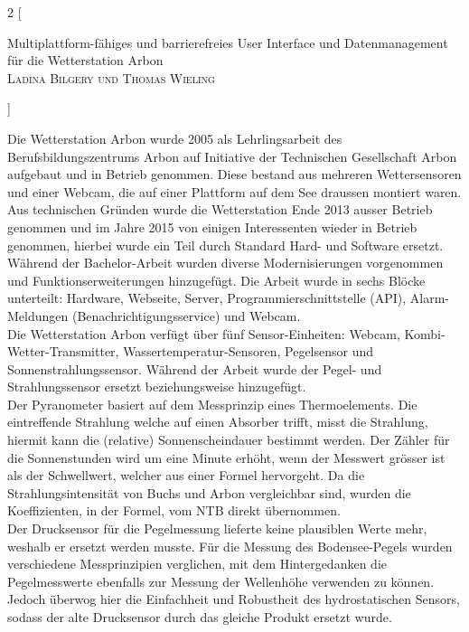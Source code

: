 \documentclass[10pt]{article}
\begin{document}
\begin{multicols}{2}
[
    \begin{center}
      {\huge\sffamily Multiplattform-fähiges und barrierefreies User Interface und Datenmanagement für die Wetterstation Arbon}\\
       \vspace{2ex}
       \textsc{Ladina Bilgery und Thomas Wieling}
    \end{center}
]

Die Wetterstation Arbon wurde 2005 als Lehrlingsarbeit des Berufsbildungszentrums Arbon auf Initiative der Technischen Gesellschaft Arbon aufgebaut und in Betrieb genommen. Diese bestand aus mehreren Wettersensoren und einer Webcam, die auf einer Plattform auf dem See draussen montiert waren. Aus technischen Gründen wurde die Wetterstation Ende 2013 ausser Betrieb genommen und im Jahre 2015 von einigen Interessenten wieder in Betrieb genommen, hierbei wurde ein Teil durch Standard Hard- und Software ersetzt. Während der Bachelor-Arbeit wurden diverse Modernisierungen vorgenommen und Funktionserweiterungen hinzugefügt. Die Arbeit wurde in sechs Blöcke unterteilt: Hardware, Webseite, Server, Programmierschnittstelle (API), Alarm-Meldungen (Benachrichtigungsservice) und Webcam.\\
Die Wetterstation Arbon verfügt über fünf Sensor-Einheiten: Webcam, Kombi-Wetter-Transmitter, Wassertemperatur-Sensoren, Pegelsensor und Sonnenstrahlungssensor. Während der Arbeit wurde der Pegel- und Strahlungssensor ersetzt beziehungsweise hinzugefügt.\\ 
Der Pyranometer basiert auf dem Messprinzip eines Thermoelements. Die eintreffende Strahlung welche auf einen Absorber trifft, misst die Strahlung, hiermit kann die (relative) Sonnenscheindauer bestimmt werden. Der Zähler für die Sonnenstunden wird um eine Minute erhöht, wenn der Messwert grösser ist als der Schwellwert, welcher aus einer Formel hervorgeht. Da die Strahlungsintensität von Buchs und Arbon vergleichbar sind, wurden die Koeffizienten, in der Formel, vom NTB direkt übernommen.\\
Der Drucksensor für die Pegelmessung lieferte keine plausiblen Werte mehr, weshalb er ersetzt werden musste. Für die Messung des Bodensee-Pegels wurden verschiedene Messprinzipien verglichen, mit dem Hintergedanken die Pegelmesswerte ebenfalls zur Messung der Wellenhöhe verwenden zu können. Jedoch überwog hier die Einfachheit und Robustheit des hydrostatischen Sensors, sodass der alte Drucksensor durch das gleiche Produkt ersetzt wurde. 


\end{multicols}
\end{document}
